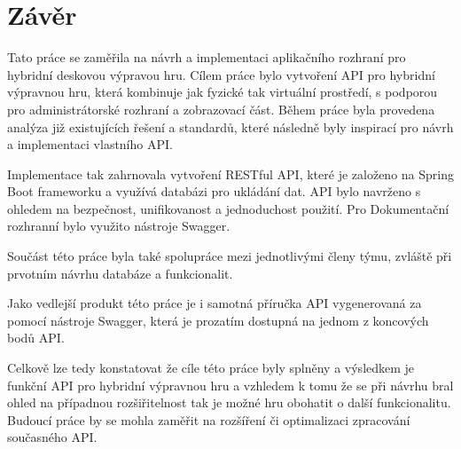 \chapter{Závěr}
Tato práce se zaměřila na návrh a implementaci aplikačního rozhraní pro hybridní deskovou výpravou hru.
Cílem práce bylo vytvoření API pro hybridní výpravnou hru, která kombinuje jak fyzické tak virtuální prostředí, s podporou pro administrátorské rozhraní a zobrazovací část. Během práce byla provedena analýza již existujících řešení a standardů, které následně byly inspirací pro návrh a implementaci vlastního API.

Implementace tak zahrnovala vytvoření RESTful API, které je založeno na Spring Boot frameworku a využívá databázi pro ukládání dat. API bylo navrženo s ohledem na bezpečnost, unifikovanost a jednoduchost použití. Pro Dokumentační rozhranní bylo využito nástroje Swagger. 

Součást této práce byla také spolupráce mezi jednotlivými členy týmu, zvláště při prvotním návrhu databáze a funkcionalit. 

Jako vedlejší produkt této práce je i samotná příručka API vygenerovaná za pomocí nástroje Swagger, která je prozatím dostupná na jednom z koncových bodů API.

Celkově lze tedy konstatovat že cíle této práce byly splněny a výsledkem je funkční API pro hybridní výpravnou hru a vzhledem k tomu že se při návrhu bral ohled na případnou rozšiřitelnost tak je možné hru obohatit o další funkcionalitu. Budoucí práce by se mohla zaměřit na rozšíření či optimalizaci zpracování současného API.

\endinput